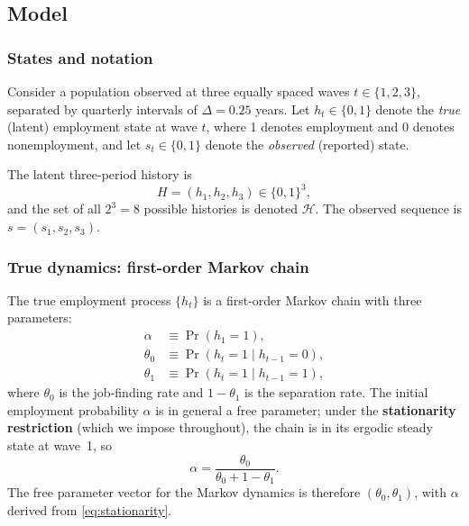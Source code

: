 

\subsection{Model}

\subsubsection{States and notation}

Consider a population observed at three equally spaced waves
\(t \in \{1, 2, 3\}\), separated by quarterly intervals of
\(\Delta = 0.25\) years. Let \(h_t \in \{0, 1\}\) denote the
\emph{true} (latent) employment state at wave \(t\), where 1 denotes
employment and 0 denotes nonemployment, and let
\(s_t \in \{0, 1\}\) denote the \emph{observed} (reported) state.

The latent three-period history is
\[
H = (h_1, h_2, h_3) \in \{0, 1\}^3,
\]
and the set of all \(2^3 = 8\) possible histories is denoted
\(\mathcal{H}\). The observed sequence is
\(s = (s_1, s_2, s_3)\).

\subsubsection{True dynamics: first-order Markov chain}

The true employment process \(\{h_t\}\) is a first-order Markov chain
with three parameters:
\begin{align}
\alpha      &\equiv \Pr(h_1 = 1),                          \label{eq:alpha} \\
\theta_0    &\equiv \Pr(h_t = 1 \mid h_{t-1} = 0),      \label{eq:theta0} \\
\theta_1    &\equiv \Pr(h_t = 1 \mid h_{t-1} = 1),      \label{eq:theta1}
\end{align}
where \(\theta_0\) is the job-finding rate and \(1 - \theta_1\) is the
separation rate. The initial employment probability \(\alpha\) is in
general a free parameter; under the \textbf{stationarity restriction}
(which we impose throughout), the chain is in its ergodic steady state
at wave~1, so
\begin{equation}
\alpha = \frac{\theta_0}{\theta_0 + 1 - \theta_1}.
\label{eq:stationarity}
\end{equation}
The free parameter vector for the Markov dynamics is therefore
\((\theta_0, \theta_1)\), with \(\alpha\) derived from
\eqref{eq:stationarity}.

